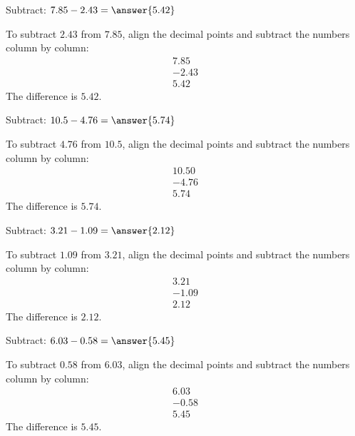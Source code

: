 \documentclass{ximera}
\begin{document}
\begin{problem}
Subtract: $7.85 - 2.43 = \answer{5.42}$
\begin{feedback}
To subtract $2.43$ from $7.85$, align the decimal points and subtract the numbers column by column:
\begin{align*}
  7.85 \\
- 2.43 \\
\hline
  5.42
\end{align*}
The difference is $5.42$.
\end{feedback}
\end{problem}

\begin{problem}
Subtract: $10.5 - 4.76 = \answer{5.74}$
\begin{feedback}
To subtract $4.76$ from $10.5$, align the decimal points and subtract the numbers column by column:
\begin{align*}
 10.50 \\
- 4.76 \\
\hline
  5.74
\end{align*}
The difference is $5.74$.
\end{feedback}
\end{problem}

\begin{problem}
Subtract: $3.21 - 1.09 = \answer{2.12}$
\begin{feedback}
To subtract $1.09$ from $3.21$, align the decimal points and subtract the numbers column by column:
\begin{align*}
  3.21 \\
- 1.09 \\
\hline
  2.12
\end{align*}
The difference is $2.12$.
\end{feedback}
\end{problem}

\begin{problem}
Subtract: $6.03 - 0.58 = \answer{5.45}$
\begin{feedback}
To subtract $0.58$ from $6.03$, align the decimal points and subtract the numbers column by column:
\begin{align*}
  6.03 \\
- 0.58 \\
\hline
  5.45
\end{align*}
The difference is $5.45$.
\end{feedback}
\end{problem}
\end{document}
